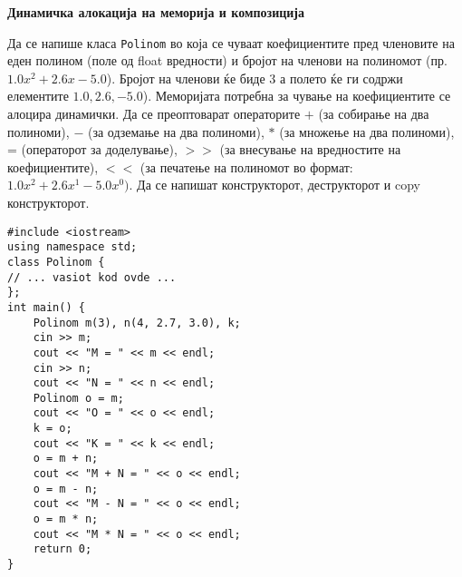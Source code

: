\documentclass[12pt,a4paper]{exam}
\begin{document}
\pagestyle{headandfoot}
\headrule
{}
\begin{center}
\Large{\textbf{Динамичка алокација на меморија и композиција}}
\end{center}
\begin{questions}

\question
Да се напише класа \texttt{Polinom} во која се чуваат коефициентите пред
членовите на еден полином (поле од float вредности) и бројот на членови на
полиномот (пр. $1.0x^2 + 2.6x - 5.0$). Бројот на членови ќе биде 3 а полето
ќе ги содржи елементите $1.0, 2.6, -5.0$). Меморијата потребна за чување на
коефициентите се алоцира динамички. Да се преоптоварат операторите $+$ (за
собирање на два полиноми), $-$ (за одземање на два полиноми), $*$ (за множење
на два полиноми), = (операторот за доделување), $>>$ (за внесување на
вредностите на коефициентите), $<<$ (за печатење на полиномот во формат: $1.0x^2
+ 2.6x^1 - 5.0x^0)$. Да се напишат конструкторот, деструкторот и copy конструкторот.

\begin{lstlisting}
#include <iostream>
using namespace std;
class Polinom {
// ... vasiot kod ovde ...
};
int main() {
    Polinom m(3), n(4, 2.7, 3.0), k;
    cin >> m;
    cout << "M = " << m << endl;
    cin >> n;
    cout << "N = " << n << endl;
    Polinom o = m;
    cout << "O = " << o << endl;
    k = o;
    cout << "K = " << k << endl;
    o = m + n;
    cout << "M + N = " << o << endl;
    o = m - n;
    cout << "M - N = " << o << endl;
    o = m * n;
    cout << "M * N = " << o << endl;
    return 0;
}
\end{lstlisting}

\end{questions}
\end{document}
